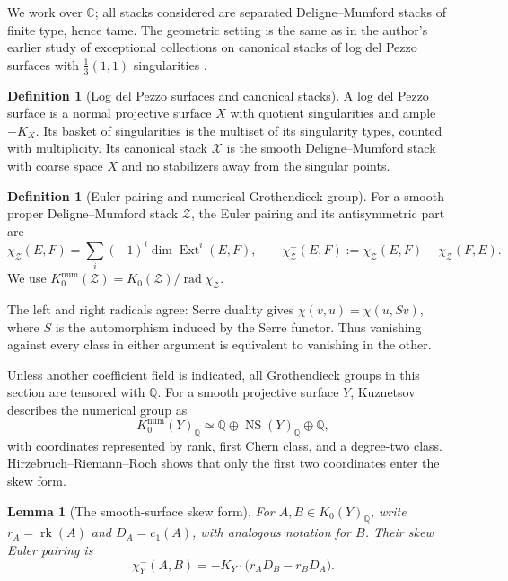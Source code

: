 \documentclass[11pt]{article}
\theoremstyle{plain}
\newtheorem{lemma}[theorem]{Lemma}
\theoremstyle{definition}
\newtheorem{definition}[theorem]{Definition}
\theoremstyle{remark}
\newcommand{\cX}{\mathcal X}
\newcommand{\NS}{\operatorname{NS}}
\newcommand{\rk}{\operatorname{rk}}
\newcommand{\Ext}{\operatorname{Ext}}
\newcommand{\C}{\mathbb C}
\newcommand{\Q}{\mathbb Q}
\newcommand{\1}{\mathbf 1}
\begin{document}
We work over $\C$; all stacks considered are separated Deligne--Mumford stacks of finite type, hence tame.  The geometric setting is the same as in the author's earlier study of exceptional collections on canonical stacks of log del Pezzo surfaces with $\frac13(1,1)$ singularities \cite{GS}.

\begin{definition}[Log del Pezzo surfaces and canonical stacks]
A log del Pezzo surface is a normal projective surface $X$ with quotient singularities and ample $-K_X$.  Its basket of singularities is the multiset of its singularity types, counted with multiplicity.  Its canonical stack $\cX$ is the smooth Deligne--Mumford stack with coarse space $X$ and no stabilizers away from the singular points.
\end{definition}


\begin{definition}[Euler pairing and numerical Grothendieck group]
For a smooth proper Deligne--Mumford stack $\mathcal Z$, the Euler pairing and its antisymmetric part are
\[
\chi_{\mathcal Z}(E,F)
=\sum_i(-1)^i\dim\Ext^i(E,F),
\qquad
\chi_{\mathcal Z}^-(E,F)
:=\chi_{\mathcal Z}(E,F)-\chi_{\mathcal Z}(F,E).
\]
We use $K_0^{\mathrm{num}}(\mathcal Z)=K_0(\mathcal Z)/\operatorname{rad}\chi_{\mathcal Z}$.
\end{definition}

The left and right radicals agree: Serre duality gives $\chi(v,u)=\chi(u,Sv)$, where $S$ is the automorphism induced by the Serre functor.  Thus vanishing against every class in either argument is equivalent to vanishing in the other.

Unless another coefficient field is indicated, all Grothendieck groups in this section are tensored with $\Q$.  For a smooth projective surface $Y$, Kuznetsov \cite[Example 3.5]{Kuz} describes the numerical group as
\[
K_0^{\mathrm{num}}(Y)_{\Q}
\simeq
\Q\oplus\NS(Y)_{\Q}\oplus\Q,
\]
with coordinates represented by rank, first Chern class, and a degree-two class.  Hirzebruch--Riemann--Roch shows that only the first two coordinates enter the skew form.

\begin{lemma}[The smooth-surface skew form]\label{lem:RR-skew}
For $A,B\in K_0(Y)_{\Q}$, write $r_A=\rk(A)$ and $D_A=c_1(A)$, with analogous notation for $B$.  Their skew Euler pairing is
\begin{equation}\label{eq:smooth-skew}
\chi_Y^-(A,B)
=-K_Y\cdot\bigl(r_A D_B-r_BD_A\bigr).
\end{equation}
\end{lemma}
\end{document}
